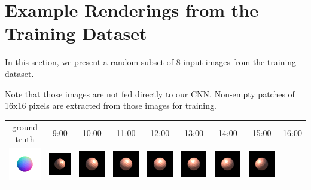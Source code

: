 \protect\hypertarget{trainingrenders}{}{}

\hypertarget{example-renderings-from-the-training-dataset}{%
\section{Example Renderings from the Training
Dataset}\label{example-renderings-from-the-training-dataset}}

In this section, we present a random subset of 8 input images from the training dataset.

Note that those images are not fed directly to our CNN. Non-empty
patches of 16x16 pixels are extracted from those images for training.


\begin{center}
\begin{longtable}{@{}c@{}c@{}c@{}c@{}c@{}c@{}c@{}c@{}c@{}}
ground truth & 9:00 & 10:00 & 11:00 & 12:00 & 13:00 & 14:00 & 15:00 & 16:00\\
\includegraphics[width=0.1\linewidth]{training/0_gt.png} & \includegraphics[width=0.1\linewidth]{training/0_0.png} &
\includegraphics[width=0.1\linewidth]{training/0_1.png} & \includegraphics[width=0.1\linewidth]{training/0_2.png} &
\includegraphics[width=0.1\linewidth]{training/0_3.png} & \includegraphics[width=0.1\linewidth]{training/0_4.png} &
\includegraphics[width=0.1\linewidth]{training/0_5.png} & \includegraphics[width=0.1\linewidth]{training/0_6.png} &

\end{longtable}
\end{center}
